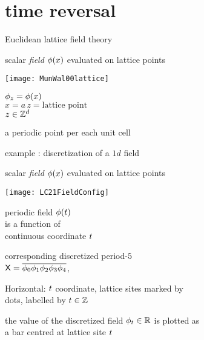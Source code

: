 \section[time reversal]
 {time reversal}

\begin{frame}{Euclidean lattice field theory}
    \begin{block}{scalar \emph{field} $\phi(x)$}
 evaluated on lattice points

\begin{center}
            \begin{minipage}[c]{0.32\textwidth}\begin{center}
\texttt{[image: MunWal00lattice]}
            \end{center}
            \end{minipage}
            \hspace{2ex}
            \begin{minipage}[c]{0.46\textwidth}
$\phi_z
=
\phi(x)$
\\
$
x = a\,z= \mbox{lattice point}$
\\
$
z \in \integers^d %
$
            \end{minipage}
\end{center}
a periodic point per each unit cell
    \end{block}
\end{frame} %

\begin{frame}{example : discretization of a $1d$ field}
    \begin{block}{scalar \emph{field} $\phi(x)$ evaluated on lattice points}

\begin{center}
\texttt{[image: LC21FieldConfig]}

\bigskip
            \begin{minipage}[c]{0.42\textwidth}
periodic field $\phi(t)$
\\
is a function of
\\
continuous coordinate $t$
            \end{minipage}
            \hspace{2ex}
            \begin{minipage}[c]{0.42\textwidth}
corresponding discretized period-$5$ {\lattstate}
\\
$\mathsf{X}={\overline{\phi_0 \phi_1 \phi_2 \phi_3 \phi_4}}$,
            \end{minipage}
\end{center}
    \end{block}
Horizontal: $t$ coordinate, lattice sites marked by
\\
dots, labelled by $t\in\mathbb{Z}$

\medskip
the value of the discretized field $\phi_{t}\in\mathbb{R}$ is plotted as
\\
a bar centred at lattice site $t$
\end{frame} %

